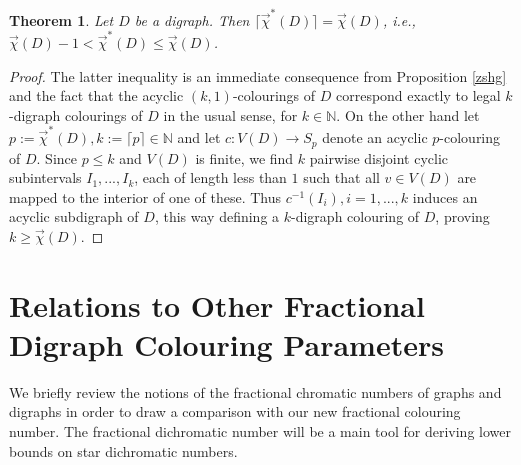 \documentclass[fontsize=11pt,a4paper,DIV12]{scrartcl}
\theoremstyle{meiner}
\newtheorem{theorem}{Theorem}
\theoremstyle{definition}
\begin{document}
\begin{theorem}
Let $D$ be a digraph. Then $\lceil \vec{\chi}^\ast(D)\rceil=\vec{\chi}(D)$, i.e., $\vec{\chi}(D)-1<\vec{\chi}^\ast(D) \leq \vec{\chi}(D)$.
\end{theorem}
\begin{proof}
  The latter inequality is an immediate consequence from Proposition
  \ref{zshg} and the fact that the acyclic $(k,1)$-colourings of $D$
  correspond exactly to legal $k$-digraph colourings of $D$ in the
  usual sense, for $k \in \mathbb{N}$. On the other hand let
  $p:=\vec{\chi}^\ast(D), k:=\lceil p \rceil \in \mathbb{N} $ and let
  $c:V(D) \rightarrow S_p$ denote an acyclic $p$-colouring of $D$.
  Since $p\le k$ and $V(D)$ is finite, we find $k$ pairwise disjoint
  cyclic subintervals $I_1,...,I_k$, each of length less than $1$ such
  that all $v \in V(D)$ are mapped to the interior of one of these.
  Thus $c^{-1}(I_i), i=1,...,k$ induces an acyclic subdigraph of $D$,
  this way defining a $k$-digraph colouring of $D$, proving $k
  \geq \vec{\chi}(D)$.
\end{proof}

\section{Relations to Other Fractional Digraph Colouring Parameters}
We briefly review the notions of the fractional chromatic
numbers of graphs and digraphs in order to draw a comparison with our
new fractional colouring number. The fractional dichromatic number
will be a main tool for deriving lower bounds on star dichromatic
numbers.
\end{document}

